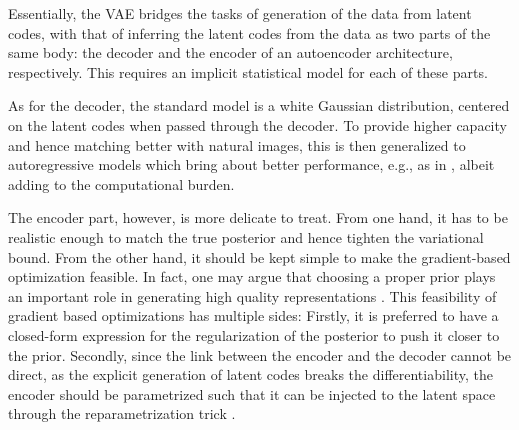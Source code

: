 \documentclass{article}
\begin{document}
Essentially, the VAE bridges the tasks of generation of the data from latent codes, with that of inferring the latent codes from the data as two parts of the same body: the decoder and the encoder of an autoencoder architecture, respectively. This requires an implicit statistical model for each of these parts.

As for the decoder, the standard model is a white Gaussian distribution, centered on the latent codes when passed through the decoder. To provide higher capacity and hence matching better with natural images, this is then generalized to autoregressive models which bring about better performance, e.g., as in \cite{FlowVAE, gulrajani2016pixelvae, lucas2018auxiliary}, albeit adding to the computational burden. 

%

The encoder part, however, is more delicate to treat. From one hand, it has to be realistic enough to match the true posterior and hence tighten the variational bound. From the other hand, it should be kept simple to make the gradient-based optimization feasible. In fact, one may argue that choosing a proper prior plays an important role in generating high quality representations \cite{VampPrior}. 
This feasibility of gradient based optimizations has multiple sides: Firstly, it is preferred to have a closed-form expression for the regularization of the posterior to push it closer to the prior. Secondly, since the link between the encoder and the decoder cannot be direct, as the explicit generation of latent codes breaks the differentiability, the encoder should be parametrized such that it can be injected to the latent space through the reparametrization trick \cite{VAE}. 
\end{document}
